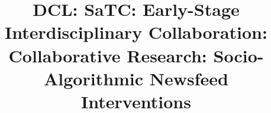 \documentclass{nsf_proposal}
\title{\vspace{-40pt}
\normalsize\textbf{DCL: SaTC: Early-Stage Interdisciplinary Collaboration: Collaborative Research: Socio-Algorithmic Newsfeed Interventions} 
\vspace{-40pt}}
\begin{document}




\setcounter{page}{1}
\renewcommand{\thepage} {B--\arabic{page}}
\newpage



\newpage
{}
\renewcommand{\thepage}{D--\arabic{page}}


\newpage
{}
\renewcommand{\thepage}{E--\arabic{page}}


% 
% 

\newpage
{}
\renewcommand{\thepage} {G--\arabic{page}}


%
% 
% 

\newpage
{}
\renewcommand{\thepage} {I--\arabic{page}}

\end{document}
